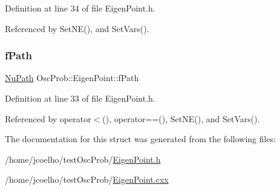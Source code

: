 Definition at line 34 of file Eigen\+Point.\+h.



Referenced by Set\+N\+E(), and Set\+Vars().

\mbox{\label{structOscProb_1_1EigenPoint_a1c263b6ceef5bd4de3181182f944efbb}} 
\subsubsection{\texorpdfstring{f\+Path}{fPath}}
{\footnotesize\ttfamily \hyperlink{structOscProb_1_1NuPath}{Nu\+Path} Osc\+Prob\+::\+Eigen\+Point\+::f\+Path}



Definition at line 33 of file Eigen\+Point.\+h.



Referenced by operator$<$(), operator==(), Set\+N\+E(), and Set\+Vars().



The documentation for this struct was generated from the following files\+:\begin{DoxyCompactItemize}
\item 
/home/jcoelho/test\+Osc\+Prob/\hyperlink{EigenPoint_8h}{Eigen\+Point.\+h}\item 
/home/jcoelho/test\+Osc\+Prob/\hyperlink{EigenPoint_8cxx}{Eigen\+Point.\+cxx}\end{DoxyCompactItemize}
